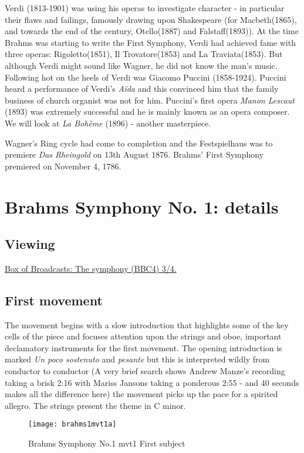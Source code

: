 Verdi (1813-1901) was using his operas to investigate character - in particular their flaws and failings, famously drawing upon Shakespeare (for Macbeth(1865), and towards the end of the century, Otello(1887) and Falstaff(1893)). 
At the time Brahms was starting to write the First Symphony, Verdi had achieved fame with three operas: Rigoletto(1851), Il Trovatore(1853) and La Traviata(1853). But although Verdi might sound like Wagner, he did not know the man's music. Following hot on the heels of Verdi was Giacomo Puccini (1858-1924). Puccini heard a performance of Verdi's \textit{A\"ida} and this convinced him that the family business of church organist was not for him. Puccini's first opera \textit{Manon Lescaut} (1893) was extremely successful and he is mainly known as an opera composer. We will look at \textit{La Boh\`eme} (1896) - another masterpiece. 

Wagner's Ring cycle had come to completion and the Festspielhaus was to premiere \textit{Das Rheingold} on 13th August 1876. Brahms' First Symphony premiered on November 4, 1786. 

\section{Brahms Symphony No. 1: details} 

\subsection{Viewing}
\href{http://bobnational.net/record/92680/media_id/99760}{Box of Broadcasts: The symphony (BBC4) 3/4.} 

\subsection{First movement}

The movement begins with a slow introduction that highlights some of the key cells of the piece and focuses attention upon the strings and oboe, important declamatory instruments for the first movement. The opening introduction is marked \textit{Un poco sostenuto} and \textit{pesante} but this is interpreted wildly from conductor to conductor (A very brief search shows Andrew Manze's recording taking a brisk 2:16 with Mariss Jansons taking a ponderous 2:55 - and 40 seconds makes all the difference here) the movement picks up the pace for a spirited allegro. The strings present the theme in C minor.

\begin{figure}[H]
\centering
\texttt{[image: brahms1mvt1a]}\caption{Brahms Symphony No.1 mvt1 First subject}
\label{fig:b1m1first}
\end{figure}

